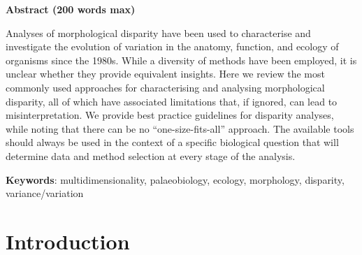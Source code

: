 \documentclass[12pt,letterpaper]{article}
\begin{document}
\modulolinenumbers[1]
\linenumbers

\textbf{Abstract (200 words max)}

\noindent Analyses of morphological disparity have been used to characterise and investigate the evolution of variation in the anatomy, function, and ecology of organisms since the 1980s.
While a diversity of methods have been employed, it is unclear whether they provide
equivalent insights.
Here we review the most commonly used approaches for characterising and analysing morphological disparity, all of which have associated limitations that, if ignored, can lead to misinterpretation.
We provide best practice guidelines for disparity analyses, while noting that there can be no ``one-size-fits-all'' approach.
The available tools should always be used in the context of a specific biological question that will determine data and method selection at every stage of the analysis.
 
\textbf{Keywords}: multidimensionality, palaeobiology, ecology, morphology, disparity, variance/variation

\section{Introduction}

\end{document}
